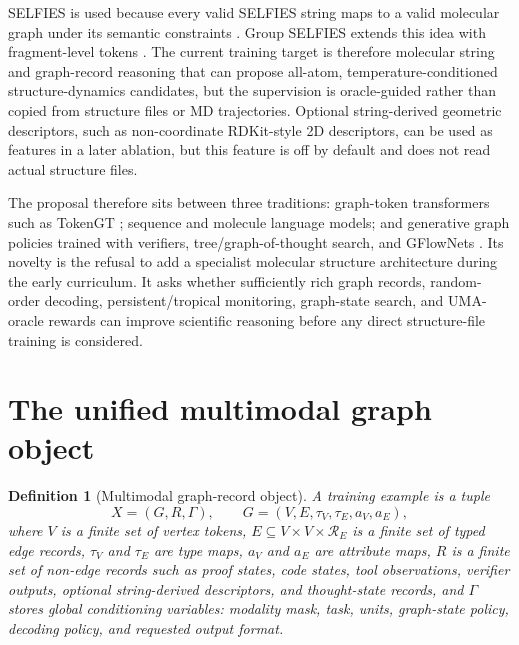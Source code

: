 \documentclass[11pt]{article}
\newtheorem{definition}{Definition}[section]
\newcommand{\1}{\mathbf{1}}
\begin{document}
SELFIES is used because every valid SELFIES string maps to a valid molecular graph under its semantic constraints \cite{KrennSELFIES2020}. Group SELFIES extends this idea with fragment-level tokens \cite{ChengGroupSELFIES2023}. The current training target is therefore molecular string and graph-record reasoning that can propose all-atom, temperature-conditioned structure-dynamics candidates, but the supervision is oracle-guided rather than copied from structure files or MD trajectories. Optional string-derived geometric descriptors, such as non-coordinate RDKit-style 2D descriptors, can be used as features in a later ablation, but this feature is off by default and does not read actual structure files.

The proposal therefore sits between three traditions: graph-token transformers such as TokenGT \cite{KimTokenGT2022}; sequence and molecule language models; and generative graph policies trained with verifiers, tree/graph-of-thought search, and GFlowNets \cite{GatDFM2024,LouSEDD2024,BengioGFlowFoundations2023,VolokhovaConfGFN2024}. Its novelty is the refusal to add a specialist molecular structure architecture during the early curriculum. It asks whether sufficiently rich graph records, random-order decoding, persistent/tropical monitoring, graph-state search, and UMA-oracle rewards can improve scientific reasoning before any direct structure-file training is considered.

\section{The unified multimodal graph object}

\begin{definition}[Multimodal graph-record object]
A training example is a tuple
\[
  X=(G,R,\Gamma),\qquad G=(V,E,\tau_V,\tau_E,a_V,a_E),
\]
where $V$ is a finite set of vertex tokens, $E\subseteq V\times V\times \mathcal R_E$ is a finite set of typed edge records, $\tau_V$ and $\tau_E$ are type maps, $a_V$ and $a_E$ are attribute maps, $R$ is a finite set of non-edge records such as proof states, code states, tool observations, verifier outputs, optional string-derived descriptors, and thought-state records, and $\Gamma$ stores global conditioning variables: modality mask, task, units, graph-state policy, decoding policy, and requested output format.
\end{definition}
\end{document}
